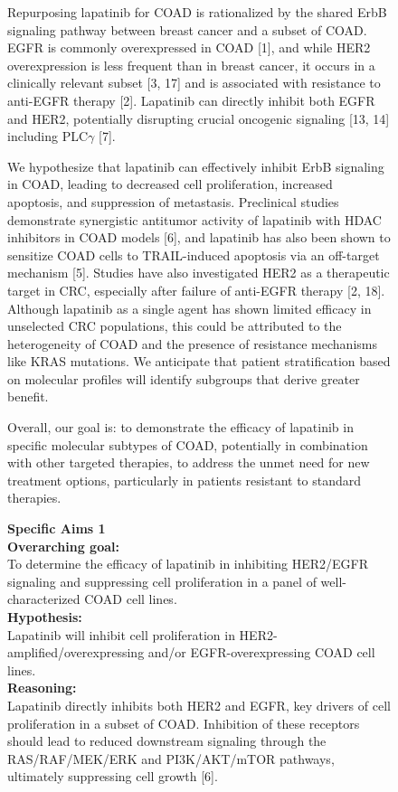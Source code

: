 \begin{figure}[htbp!]
\begin{tcolorbox}[title=Lapatinib for colon cancer]
Repurposing lapatinib for COAD is rationalized by the shared ErbB signaling pathway between breast cancer and a subset of COAD. EGFR is commonly overexpressed in COAD [1], and while HER2 overexpression is less frequent than in breast cancer, it occurs in a clinically relevant subset [3, 17] and is associated with resistance to anti-EGFR therapy [2]. Lapatinib can directly inhibit both EGFR and HER2, potentially disrupting crucial oncogenic signaling [13, 14] including PLC$\gamma$ [7].

We hypothesize that lapatinib can effectively inhibit ErbB signaling in COAD, leading to decreased cell proliferation, increased apoptosis, and suppression of metastasis. Preclinical studies demonstrate synergistic antitumor activity of lapatinib with HDAC inhibitors in COAD models [6], and lapatinib has also been shown to sensitize COAD cells to TRAIL-induced apoptosis via an off-target mechanism [5]. Studies have also investigated HER2 as a therapeutic target in CRC, especially after failure of anti-EGFR therapy [2, 18]. Although lapatinib as a single agent has shown limited efficacy in unselected CRC populations, this could be attributed to the heterogeneity of COAD and the presence of resistance mechanisms like KRAS mutations. We anticipate that patient stratification based on molecular profiles will identify subgroups that derive greater benefit.

Overall, our goal is: to demonstrate the efficacy of lapatinib in specific molecular subtypes of COAD, potentially in combination with other targeted therapies, to address the unmet need for new treatment options, particularly in patients resistant to standard therapies.

\textbf{Specific Aims 1}\\
\textbf{Overarching goal:}\\
To determine the efficacy of lapatinib in inhibiting HER2/EGFR signaling and suppressing cell proliferation in a panel of well-characterized COAD cell lines.\\
\textbf{Hypothesis:}\\
Lapatinib will inhibit cell proliferation in HER2-amplified/overexpressing and/or EGFR-overexpressing COAD cell lines.\\
\textbf{Reasoning:}\\
Lapatinib directly inhibits both HER2 and EGFR, key drivers of cell proliferation in a subset of COAD. Inhibition of these receptors should lead to reduced downstream signaling through the RAS/RAF/MEK/ERK and PI3K/AKT/mTOR pathways, ultimately suppressing cell growth [6].\\
\end{tcolorbox}
\end{figure}

